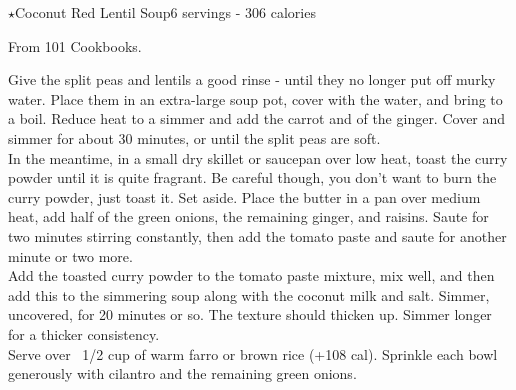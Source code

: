 \begin{recipe}{\texorpdfstring{$\star$}{str}Coconut Red Lentil Soup}{6 servings - 306 calories}{}

\freeform From 101 Cookbooks.


Give the split peas and lentils a good rinse - until they no longer put off murky water. Place them in an extra-large soup pot, cover with the water, and bring to a boil. Reduce heat to a simmer and add the carrot and  of the ginger. Cover and simmer for about 30 minutes, or until the split peas are soft.\\

In the meantime, in a small dry skillet or saucepan over low heat, toast the curry powder until it is quite fragrant. Be careful though, you don't want to burn the curry powder, just toast it. Set aside. Place the butter in a pan over medium heat, add half of the green onions, the remaining ginger, and raisins. Saute for two minutes stirring constantly, then add the tomato paste and saute for another minute or two more.\\

Add the toasted curry powder to the tomato paste mixture, mix well, and then add this to the simmering soup along with the coconut milk and salt. Simmer, uncovered, for 20 minutes or so. The texture should thicken up. Simmer longer for a thicker consistency.\\

Serve over ~1/2 cup of warm farro or brown rice (+108 cal). Sprinkle each bowl generously with cilantro and the remaining green onions.

\end{recipe}